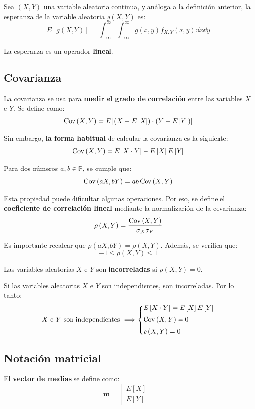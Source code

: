 \documentclass[a4paper]{book}
\renewcommand{\vec}[1]{\mathbf{#1}} %
\begin{document}
Sea $\left(X,Y\right)$ una variable aleatoria continua, y análoga a la definición anterior, la esperanza de la variable aleatoria $g\left(X,Y\right)$ es:
\[E\left[g\left(X,Y\right)\right] = \int_{-\infty}^{\infty}\int_{-\infty}^{\infty}g\left(x,y\right)f_{X,Y}(x,y)\dd{x} \dd{y}\]

La esperanza es un operador \textbf{lineal}.

\subsection{Covarianza}

La covarianza se usa para \textbf{medir el grado de correlación} entre las variables $X$ e $Y$. Se define como:
\[\operatorname{Cov} \left( X,Y \right) = E \left[\left(X-E\left[X\right]\right) \cdot \left(Y - E\left[Y\right]\right)\right]\]

Sin embargo, \textbf{la forma habitual} de calcular la covarianza es la siguiente:
\[\operatorname{Cov} \left( X,Y \right) = E\left[X\cdot Y\right] - E\left[X\right]E\left[Y\right]\]

Para dos números $a,b \in \mathbb{R}$, se cumple que:
\[\operatorname{Cov} \left( aX,bY \right) = ab\operatorname{Cov} \left( X,Y \right)\]

Esta propiedad puede dificultar algunas operaciones. Por eso, se define el \textbf{coeficiente de correlación lineal} mediante la normalización de la covarianza:
\[\rho \left(X,Y\right) = \frac{\operatorname{Cov} \left( X,Y \right)}{\sigma _X \sigma _Y} \]

Es importante recalcar que $\rho \left( aX,bY \right) = \rho \left( X,Y \right) $. Además, se verifica que:
\[-1\leq \rho \left( X,Y \right) \leq 1 \]

Las variables aleatorias $X$ e $Y$ son \textbf{incorreladas} si $\rho \left( X,Y \right)=0$.

Si las variables aleatorias $X$ e $Y$ son independientes, son incorreladas. Por lo tanto:
\[X \text{ e } Y \text{ son independientes} \ \Longrightarrow \left\lbrace \begin{matrix*}[l]
	E \left[ X \cdot Y \right] = E \left[ X \right] E \left[ Y \right] \\[5pt] 
	\Cov \left( X,Y \right) = 0 \\[5pt] 
	\rho \left( X,Y \right) = 0
\end{matrix*} \right. \] 

\subsection{Notación matricial}
El \textbf{vector de medias} se define como:
\[ \vec{m} = \left[ 
\begin{matrix}
	E \left[ X \right]\\ 
	E \left[ Y \right]
\end{matrix} \right] \]
\end{document}

